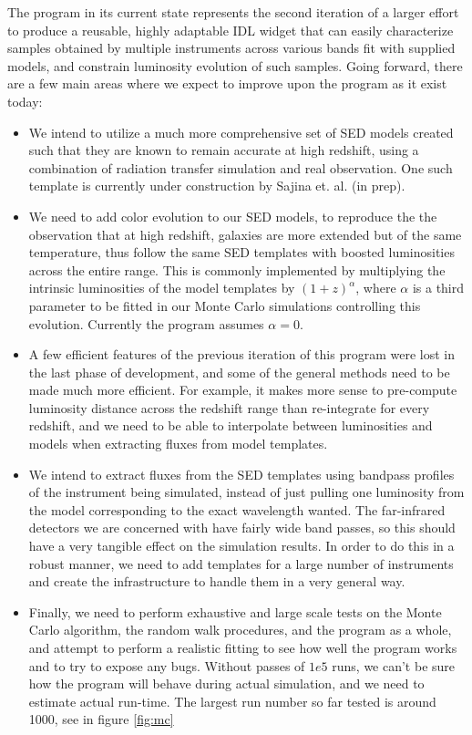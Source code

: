 \documentclass[twocolumn,letterpaper,10pt]{article}
\begin{document}
The program in its current state represents the second iteration of a larger effort to produce a reusable, highly adaptable IDL widget that can easily characterize samples obtained by multiple instruments across various bands fit with supplied models, and constrain luminosity evolution of such samples. Going forward, there are a few main areas where we expect to improve upon the program as it exist today:
\begin{itemize} \itemsep0pt \parskip0pt 
\item We intend to utilize a much more comprehensive set of SED models created such that they are known to remain accurate at high redshift, using a combination of radiation transfer simulation and real observation. One such template is currently under construction by Sajina et. al. (in prep).
\item We need to add color evolution to our SED models, to reproduce the the observation that at high redshift, galaxies are more extended but of the same temperature, thus follow the same SED templates with boosted luminosities across the entire range. This is commonly implemented by multiplying the intrinsic luminosities of the model templates by $(1+z)^\alpha$, where $\alpha$ is a third parameter to be fitted in our Monte Carlo simulations controlling this evolution. Currently the program assumes $\alpha=0$.
\item A few efficient features of the previous iteration of this program were lost in the last phase of development, and some of the general methods need to be made much more efficient. For example, it makes more sense to pre-compute luminosity distance across the redshift range than re-integrate for every redshift, and we need to be able to interpolate between luminosities and models when extracting fluxes from model templates.
\item We intend to extract fluxes from the SED templates using bandpass profiles of the instrument being simulated, instead of just pulling one luminosity from the model corresponding to the exact wavelength wanted. The far-infrared detectors we are concerned with have fairly wide band passes, so this should have a very tangible effect on the simulation results. In order to do this in a robust manner, we need to add templates for a large number of instruments and create the infrastructure to handle them in a very general way.
\item Finally, we need to perform exhaustive and large scale tests on the Monte Carlo algorithm, the random walk procedures, and the program as a whole, and attempt to perform a realistic fitting to see how well the program works and to try to expose any bugs. Without passes of $1e5$ runs, we can't be sure how the program will behave during actual simulation, and we need to estimate actual run-time. The largest run number so far tested is around 1000, see in figure \ref{fig:mc}
\end{itemize}
\end{document}
